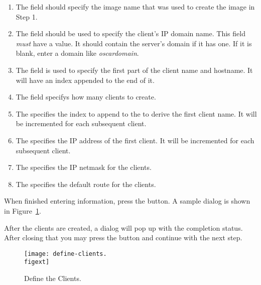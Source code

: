 \begin{enumerate}

\item The  field should specify the image name that was used to 
create the image in Step 1.

\item The  field should be used to specify the client's IP
domain name. This field \emph{must} have a value. It should contain the server's
domain if it has one. If it is blank, enter a domain like \emph{oscardomain}.

\item The  field is used to specify the first part of the 
client name and hostname. It will have an index appended to the end of it.

\item The  field specifys how many clients to create.

\item The  specifies the index to append
to the  to derive the first client name. It will be incremented
for each subsequent client.

\item The  specifies the IP address of the first client. It 
will be incremented for each subsequent client.

\item The  specifies the IP netmask for the clients.

\item The  specifies the default route for the clients.

\end{enumerate}
  
When finished entering information, press the  button.
A sample dialog is shown in Figure~\ref{fig:detailed-define-clients}. 

After the clients are created,
a dialog will pop up with the completion status. After closing that 
you may press the  button and continue with the next step.

\begin{figure}[htbp]
  \begin{center}
    \texttt{[image: define-clients.\\figext]}
    \caption{Define the Clients.}
    \label{fig:detailed-define-clients}
  \end{center}
\end{figure}
    
